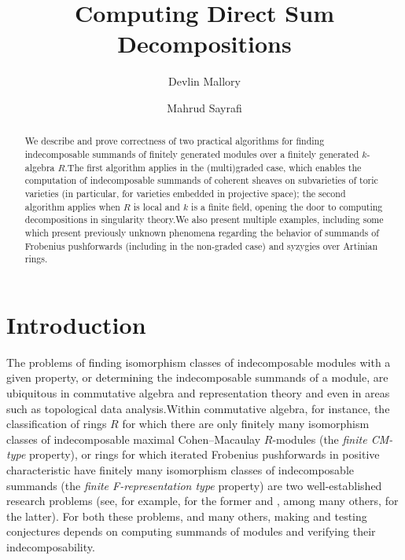 \documentclass[12pt]{amsart}
\title{Computing Direct Sum Decompositions}
\author{Devlin Mallory}
\author{Mahrud Sayrafi}
\theoremstyle{theorem}
\numberwithin{thm}{section}
\theoremstyle{definition}
\begin{document}
\maketitle

\begin{abstract}
  We describe and prove correctness of two practical algorithms for finding indecomposable summands of finitely generated modules over a finitely generated $k$-algebra $R$.\linebreak The first algorithm applies in the (multi)graded case, which enables the computation of indecomposable summands of coherent sheaves on subvarieties of toric varieties (in particular, for varieties embedded in projective space); the second algorithm applies when $R$ is local and $k$ is a finite field, opening the door to computing decompositions in singularity theory.\linebreak We also present multiple examples, including some which present previously unknown phenomena regarding the behavior of summands of Frobenius pushforwards (including in the non-graded case) and syzygies over Artinian rings.
\end{abstract}

\section{Introduction}

The problems of finding isomorphism classes of indecomposable modules with a given property, or determining the indecomposable summands of a module, are ubiquitous in commutative algebra and representation theory and even in areas such as topological data analysis.\linebreak Within commutative algebra, for instance, the classification of rings $R$ for which there are only finitely many isomorphism classes of indecomposable maximal Cohen--Macaulay $R$-modules (the \emph{finite CM-type} property), or rings for which iterated Frobenius pushforwards in positive characteristic have finitely many isomorphism classes of indecomposable summands (the \emph{finite F-representation type} property) are two well-established research problems (see, for example, \cite{Yoshino90,LW12} for the former and \cite{SVdB97,Hara15,TT08}, among many others, for the latter). For both these problems, and many others, making and testing conjectures depends on computing summands of modules and verifying their indecomposability.
\end{document}
